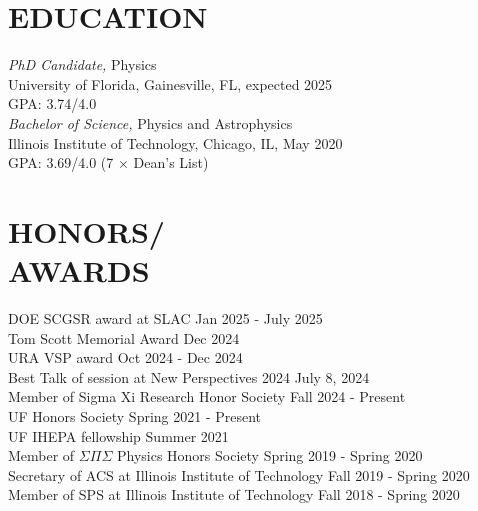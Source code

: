 \documentclass[margin, 10pt]{res} %
\begin{document}
\begin{resume}
\section{EDUCATION}
{\sl PhD Candidate,} Physics \\
University of Florida, Gainesville, FL, expected 2025 \\
GPA: 3.74/4.0 \\

{\sl Bachelor of Science,} Physics and Astrophysics \\
Illinois Institute of Technology, Chicago, IL, May 2020 \\
GPA: 3.69/4.0 (7 $\times$ Dean's List)

\section{HONORS/ \\ AWARDS} 

DOE SCGSR award at SLAC \hfill Jan 2025 - July 2025 \\
Tom Scott Memorial Award \hfill Dec 2024 \\
URA VSP award \hfill Oct 2024 - Dec 2024 \\
Best Talk of session at New Perspectives 2024 \hfill July 8, 2024 \\
Member of Sigma Xi Research Honor Society \hfill Fall 2024 - Present \\
UF Honors Society \hfill Spring 2021 - Present\\
UF IHEPA fellowship \hfill Summer 2021\\
Member of $\Sigma \Pi \Sigma$ Physics Honors Society \hfill Spring 2019 - Spring 2020\\
Secretary of ACS at Illinois Institute of Technology \hfill Fall 2019 - Spring 2020\\
Member of SPS at Illinois Institute of Technology \hfill Fall 2018 - Spring 2020 \\


\end{resume}
\end{document}
